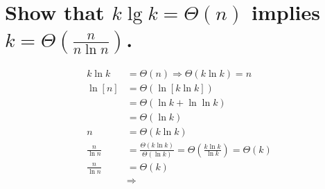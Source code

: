 \section[Problem 3]{Show that $k \lg k = \Theta(n)$ implies $k = \Theta\left(\frac{n}{n \ln n}\right)$.}
\begin{align*}
	k \ln k &= \Theta(n) \Longrightarrow \Theta(k \ln k) = n \\
	\ln [n] &= \Theta ( \ln [k \ln k ] ) \\
	&=
	\Theta (\ln k + \ln \ln k) \\
	&= \Theta(\ln k) \\
	n &= \Theta(k \ln k) \\
	\frac{n}{\ln n} &= \frac{\Theta(k \ln k)}{\Theta(\ln k)} = \Theta \left( \frac{k \ln k}{\ln k} \right) = \Theta(k) \\
	\frac{n}{\ln n} &= \Theta(k) \\
	& \Longrightarrow 
\end{align*}
